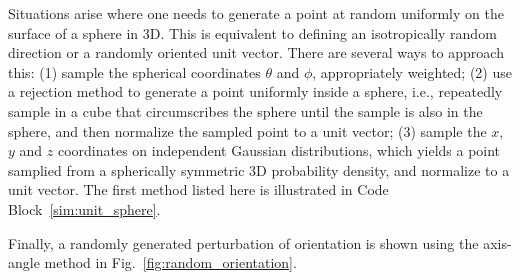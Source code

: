 \documentclass[
  9pt,
  bestpractices,
]{livecoms}
\begin{document}
Situations arise where one needs to generate a point at random uniformly on the surface of a sphere in 3D.  This is equivalent to defining an isotropically random direction or a randomly oriented unit vector. There are several ways to approach this: (1) sample the spherical coordinates $\theta$ and $\phi$, appropriately weighted; (2) use a rejection method to generate a point uniformly inside a sphere, i.e., repeatedly sample in a cube that circumscribes the sphere until the sample is also in the sphere, and then normalize the sampled point to a unit vector; (3) sample the $x$, $y$ and $z$ coordinates on independent Gaussian distributions, which yields a point samplied from a spherically symmetric 3D probability density, and normalize to a unit vector. The first method listed here is illustrated in Code Block~\ref{sim:unit_sphere}.

Finally, a randomly generated perturbation of orientation is shown using the axis-angle method in Fig.~\ref{fig:random_orientation}.

\begin{figure}

\end{figure}
\end{document}
